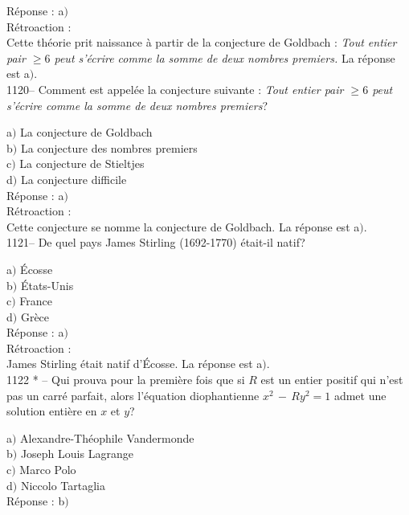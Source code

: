 ﻿\documentclass[letterpaper, 12pt]{article}
\begin{document}
R\'eponse : a$)$\\

R\'etroaction : \\
Cette th\'eorie prit naissance \`a partir de la conjecture de
Goldbach : {\sl Tout entier pair $\ge6$ peut s'\'ecrire comme la
somme de deux nombres premiers.}
La r\'eponse est a$)$.\\

1120-- Comment est appel\'ee la conjecture suivante : {\sl Tout
entier pair $\ge6$ peut s'\'ecrire comme la somme de deux nombres
premiers}?

a$)$ La conjecture de Goldbach \\
b$)$ La conjecture des nombres premiers  \\
c$)$ La conjecture de Stieltjes \\
d$)$ La conjecture difficile \\

R\'eponse : a$)$\\

R\'etroaction : \\
Cette conjecture se nomme la conjecture de Goldbach.
La r\'eponse est a$)$.\\

1121-- De quel pays James Stirling (1692-1770) \'etait-il natif?

a$)$ \'Ecosse \\
b$)$ \'Etats-Unis \\
c$)$ France  \\
d$)$ Gr\`ece   \\

R\'eponse : a$)$\\

R\'etroaction : \\
James Stirling \'etait natif d'\'Ecosse.
La r\'eponse est a$)$.\\


1122 * -- Qui prouva pour la premi\`ere fois que si $R$ est un
entier positif qui n'est pas un carr\'e parfait, alors l'\'equation
diophantienne $x^2\,-\,Ry^2=1$ admet une solution enti\`ere en $x$
et $y$?

a$)$ Alexandre-Th\'eophile Vandermonde \\
b$)$ Joseph Louis Lagrange \\
c$)$ Marco Polo \\
d$)$ Niccolo Tartaglia \\

R\'eponse : b$)$\\
\end{document}
